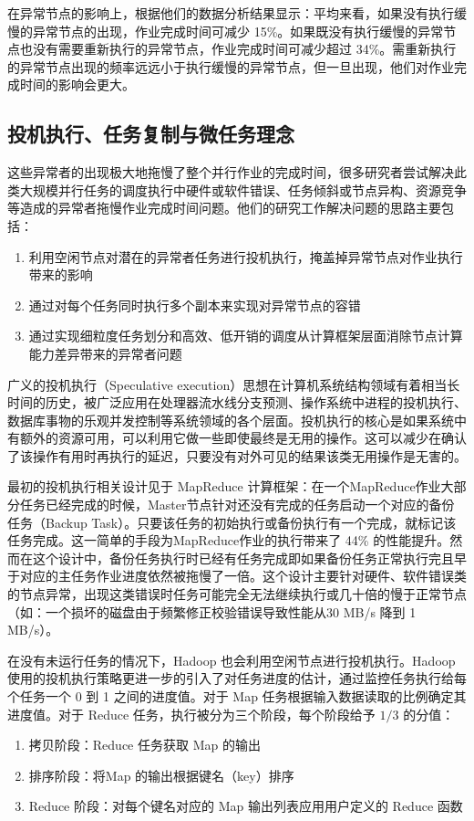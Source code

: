 在异常节点的影响上，根据他们的数据分析结果显示：平均来看，如果没有执行缓慢的异常节点的出现，作业完成时间可减少 15\%。如果既没有执行缓慢的异常节点也没有需要重新执行的异常节点，作业完成时间可减少超过 34\%。需重新执行的异常节点出现的频率远远小于执行缓慢的异常节点，但一旦出现，他们对作业完成时间的影响会更大。

\subsection{投机执行、任务复制与微任务理念}
这些异常者的出现极大地拖慢了整个并行作业的完成时间，很多研究者尝试解决此类大规模并行任务的调度执行中硬件或软件错误、任务倾斜或节点异构、资源竞争等造成的异常者拖慢作业完成时间问题。他们的研究工作解决问题的思路主要包括：
\begin{enumerate}
\item 利用空闲节点对潜在的异常者任务进行投机执行，掩盖掉异常节点对作业执行带来的影响
\item 通过对每个任务同时执行多个副本来实现对异常节点的容错
\item 通过实现细粒度任务划分和高效、低开销的调度从计算框架层面消除节点计算能力差异带来的异常者问题
\end{enumerate}

广义的投机执行（Speculative execution）思想在计算机系统结构领域有着相当长时间的历史，被广泛应用在处理器流水线分支预测、操作系统中进程的投机执行、数据库事物的乐观并发控制等系统领域的各个层面。投机执行的核心是如果系统中有额外的资源可用，可以利用它做一些即使最终是无用的操作。这可以减少在确认了该操作有用时再执行的延迟，只要没有对外可见的结果该类无用操作是无害的。

最初的投机执行相关设计见于 MapReduce 计算框架：在一个MapReduce作业大部分任务已经完成的时候，Master节点针对还没有完成的任务启动一个对应的备份任务（Backup Task）。只要该任务的初始执行或备份执行有一个完成，就标记该任务完成。这一简单的手段为MapReduce作业的执行带来了 44\% 的性能提升\cite{dean}。然而在这个设计中，备份任务执行时已经有任务完成即如果备份任务正常执行完且早于对应的主任务作业进度依然被拖慢了一倍。这个设计主要针对硬件、软件错误类的节点异常，出现这类错误时任务可能完全无法继续执行或几十倍的慢于正常节点（如：一个损坏的磁盘由于频繁修正校验错误导致性能从30 MB/s 降到 1 MB/s）。

在没有未运行任务的情况下，Hadoop 也会利用空闲节点进行投机执行。Hadoop 使用的投机执行策略更进一步的引入了对任务进度的估计，通过监控任务执行给每个任务一个 0 到 1 之间的进度值。对于 Map 任务根据输入数据读取的比例确定其进度值。对于 Reduce 任务，执行被分为三个阶段，每个阶段给予 $1/3$ 的分值：
\begin{enumerate}
\item 拷贝阶段：Reduce 任务获取 Map 的输出
\item 排序阶段：将Map 的输出根据键名（key）排序
\item Reduce 阶段：对每个键名对应的 Map 输出列表应用用户定义的 Reduce 函数
\end{enumerate}

